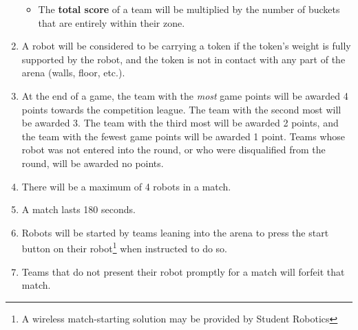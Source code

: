 \begin{enumerate}
\begin{itemize}
  \item The \textbf{total score} of a team will be multiplied by the number of buckets that are entirely within their zone.

\end{itemize}

\item A robot will be considered to be carrying a token if the token's weight is fully supported by the robot, and the token is not in contact with any part of the arena (walls, floor, etc.).

\item At the end of a game, the team with the \emph{most} game points will be awarded 4 points towards the competition league.
 The team with the second most will be awarded 3.
 The team with the third most will be awarded 2 points, and the team with the fewest game points will be awarded 1 point.
 Teams whose robot was not entered into the round, or who were disqualified from the round, will be awarded no points.

\item There will be a maximum of 4 robots in a match.
\item A match lasts 180 seconds.
\item Robots will be started by teams leaning into the arena to press the start button on their robot\footnote{A wireless match-starting solution may be provided by Student Robotics} when instructed to do so.

\item Teams that do not present their robot promptly for a match will forfeit that match.
\end{enumerate}
